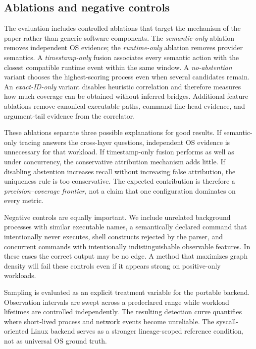 \subsection{Ablations and negative controls}
The evaluation includes controlled ablations that target the mechanism of the paper rather than generic software components. The \emph{semantic-only} ablation removes independent OS evidence; the \emph{runtime-only} ablation removes provider semantics. A \emph{timestamp-only} fusion associates every semantic action with the closest compatible runtime event within the same window. A \emph{no-abstention} variant chooses the highest-scoring process even when several candidates remain. An \emph{exact-ID-only} variant disables heuristic correlation and therefore measures how much coverage can be obtained without inferred bridges. Additional feature ablations remove canonical executable paths, command-line-head evidence, and argument-tail evidence from the correlator.

These ablations separate three possible explanations for good results. If semantic-only tracing answers the cross-layer questions, independent OS evidence is unnecessary for that workload. If timestamp-only fusion performs as well as \system under concurrency, the conservative attribution mechanism adds little. If disabling abstention increases recall without increasing false attribution, the uniqueness rule is too conservative. The expected contribution is therefore a \emph{precision--coverage frontier}, not a claim that one configuration dominates on every metric.

Negative controls are equally important. We include unrelated background processes with similar executable names, a semantically declared command that intentionally never executes, shell constructs rejected by the parser, and concurrent commands with intentionally indistinguishable observable features. In these cases the correct output may be no edge. A method that maximizes graph density will fail these controls even if it appears strong on positive-only workloads.

Sampling is evaluated as an explicit treatment variable for the portable backend. Observation intervals are swept across a predeclared range while workload lifetimes are controlled independently. The resulting detection curve quantifies where short-lived process and network events become unreliable. The syscall-oriented Linux backend serves as a stronger lineage-scoped reference condition, not as universal OS ground truth.

